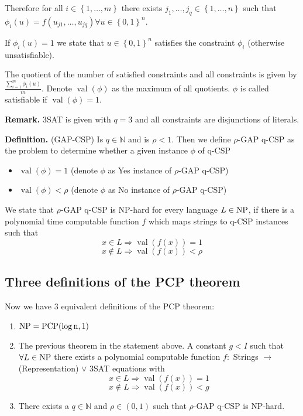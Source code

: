 \documentclass[a4paper]{article}
\newcommand{\cls}[1]{\rm{#1}}
\newcommand{\set}[1]{\left\{#1\right\}}
\begin{document}
Therefore for all $i \in \set{1,\ldots,m}$ there exists $j_1,\ldots,j_q
\in \set{1,\ldots,n}$ such that $\phi_i(u) = f(u_{j1}, \ldots, u_{jq})
\forall u \in \set{0,1}^n$.

If $\phi_i(u) = 1$ we state that $u \in \set{0,1}^n$ satisfies the constraint
$\phi_i$ (otherwise unsatisfiable).

The quotient of the number of satisfied constraints and all constraints is given
by $\frac{\sum_{i=1}^m \phi_i(u)}{m}$. Denote $\operatorname{val}(\phi)$ as the
maximum of all quotients.
$\phi$ is called satisfiable if $\operatorname{val}(\phi) = 1$.

\textbf{Remark.} 3SAT is given with $q=3$ and all constraints are
  disjunctions of literals.

\textbf{Definition.} (GAP-CSP) Is $q \in \mathbb{N}$ and is $\rho < 1$.
  Then we define $\rho$-GAP q-CSP as the problem to determine whether
  a given instance $\phi$ of q-CSP
\begin{itemize}
  \item $\operatorname{val}(\phi) = 1$
    (denote $\phi$ as Yes instance of $\rho$-GAP q-CSP)
  \item $\operatorname{val}(\phi) < \rho$
    (denote $\phi$ as No instance of $\rho$-GAP q-CSP)
\end{itemize}

We state that $\rho$-GAP q-CSP is \cls{NP}-hard for every language $L \in \cls{NP}$,
if there is a polynomial time computable function $f$ which maps strings
to q-CSP instances such that
\[
  x \in L \Rightarrow \operatorname{val}(f(x)) = 1
\] \[
  x \notin L \Rightarrow \operatorname{val}(f(x)) < \rho
\]

\subsection{Three definitions of the PCP theorem}
%
Now we have 3 equivalent definitions of the PCP theorem:
\begin{enumerate}
  \item $\cls{NP} = \cls{PCP}(\log{n}, 1)$
  \item
    The previous theorem in the statement above.
    A constant $g < I$ such that $\forall L \in \cls{NP}$
    there exists a polynomial computable function $f:$
    Strings $\rightarrow$ (Representation) $\lor$ 3SAT
    equations with
    \[
      x \in L \Rightarrow \operatorname{val}(f(x)) = 1
    \] \[
      x \notin L \Rightarrow \operatorname{val}(f(x)) < g
    \]
  \item There exists a $q \in \mathbb{N}$ and $\rho \in (0,1)$ such that
        $\rho$-GAP q-CSP is \cls{NP}-hard.
\end{enumerate}
\end{document}
